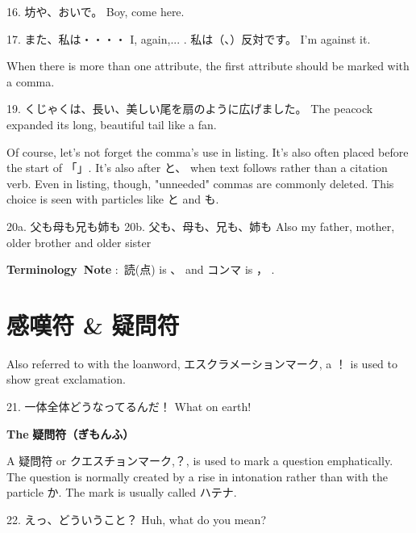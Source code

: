 \par{16. 坊や、おいで。 \hfill\break
Boy, come here. }

\par{17. また、私は・・・・ \hfill\break
I, again,\dothyp{}\dothyp{}\dothyp{} \hfill\break
 \hfill{}. 私は（、）反対です。 \hfill\break
I'm against it. }

\par{ When there is more than one attribute, the first attribute should be marked with a comma. }

\par{19. くじゃくは、長い、美しい尾を扇のように広げました。 \hfill\break
The peacock expanded its long, beautiful tail like a fan. }

\par{ Of course, let's not forget the comma's use in listing. It's also often placed before the start of 「」. It's also after と、 when text follows rather than a citation verb. Even in listing, though, "unneeded" commas are commonly deleted. This choice is seen with particles like と and も. }

\par{20a. 父も母も兄も姉も \hfill\break
20b. 父も、母も、兄も、姉も \hfill\break
Also my father, mother, older brother and older sister }

\par{\textbf{Terminology Note }: 読(点) is 、 and コンマ is ， . }
      
\section{感嘆符 \& 疑問符}
 
\par{ Also referred to with the loanword, エスクラメーションマーク, a ！ is used to show great exclamation. }

\par{21. 一体全体どうなってるんだ！ \hfill\break
What on earth! }

\begin{center}
\textbf{The }\textbf{疑問符（ぎもんふ） }
\end{center}

\par{A 疑問符 or クエスチョンマーク,？, is used to mark a question emphatically. The question is normally created by a rise in intonation rather than with the particle か. The mark is usually called ハテナ. }

\par{22. えっ、どういうこと？ \hfill\break
Huh, what do you mean? }
      
